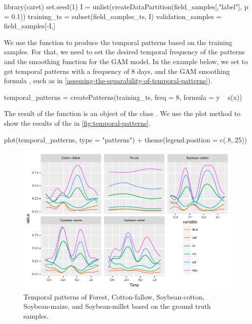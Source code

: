 \documentclass[article,shortnames]{jss}
\begin{document}
\begin{CodeChunk}
\begin{CodeInput}
library(caret) 
set.seed(1)
I = unlist(createDataPartition(field_samples[,"label"], p = 0.1))
training_ts = subset(field_samples_ts, I)
validation_samples = field_samples[-I,]
\end{CodeInput}
\end{CodeChunk}

We use the function  to produce the temporal
patterns based on the training samples. For that, we need to set the
desired temporal frequency of the patterns and the smoothing function
for the GAM model. In the example below, we set  to get
temporal patterns with a frequency of 8 days, and the GAM smoothing
formula , such as in
\autoref{assessing-the-separability-of-temporal-patterns}).

\begin{CodeChunk}
\begin{CodeInput}
temporal_patterns = 
  createPatterns(training_ts, freq = 8, formula = y ~ s(x))
\end{CodeInput}
\end{CodeChunk}

The result of the function  is an object of the
class . We use the plot method
 to show the results of the 
in \autoref{fig:temporal-patterns}.

\begin{CodeChunk}
\begin{CodeInput}
plot(temporal_patterns, type = "patterns") + 
  theme(legend.position = c(.8,.25))
\end{CodeInput}
\begin{figure}[!h]

{\centering \includegraphics{applying_twdtw_files/figure-latex/temporal-patterns-1} 

}

\caption[Temporal patterns of Forest, Cotton-fallow, Soybean-cotton, Soybean-maize, and Soybean-millet based on the ground truth samples]{Temporal patterns of Forest, Cotton-fallow, Soybean-cotton, Soybean-maize, and Soybean-millet based on the ground truth samples.}\label{fig:temporal-patterns}
\end{figure}
\end{CodeChunk}
\end{document}
